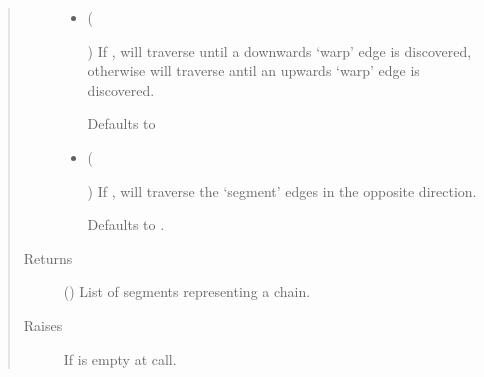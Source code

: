 \documentclass[letterpaper,10pt,english]{sphinxmanual}
\begin{document}
\begin{fulllineitems}
\begin{fulllineitems}
\begin{quote}
\begin{description}
\begin{itemize}
\item {} 
 (%
\begin{footnote}[158]\sphinxAtStartFootnote
{}
%
\end{footnote}\sphinxstyleliteralemphasis{\sphinxupquote{, }}) \textendash{} 
If , will traverse until a downwards ‘warp’ edge is
discovered, otherwise will traverse antil an upwards ‘warp’ edge
is discovered.

Defaults to 


\item {} 
 (%
\begin{footnote}[159]\sphinxAtStartFootnote
{}
%
\end{footnote}\sphinxstyleliteralemphasis{\sphinxupquote{, }}) \textendash{} 
If , will traverse the ‘segment’ edges in the opposite
direction.

Defaults to .


\end{itemize}

\item[{Returns}] \leavevmode
{} () \textendash{} List of segments representing a chain.

\item[{Raises}] \leavevmode
{} \textendash{} If  is empty at call.

\end{description}\end{quote}

\end{fulllineitems}


\end{fulllineitems}
\end{document}
